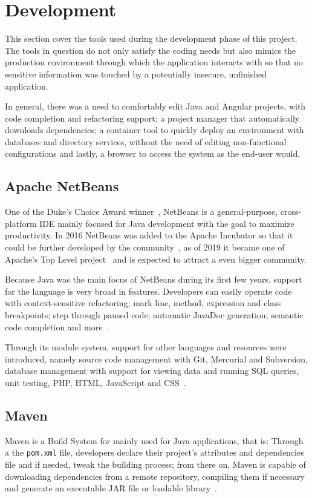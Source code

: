 \section{Development}\label{development}
This section cover the tools used during the development phase of this project. The tools in question do not only satisfy the coding needs but also mimics the production environment through which the application interacts with so that no sensitive information was touched by a potentially insecure, unfinished application.

In general, there was a need to comfortably edit Java and Angular projects, with code completion and refactoring support; a project manager that automatically downloads dependencies; a container tool to quickly deploy an environment with databases and directory services, without the need of editing non-functional configurations and lastly, a browser to access the system as the end-user would.

\subsection{Apache NetBeans}\label{netbeans}
One of the Duke's Choice Award winner~\cite{dukechoice}, NetBeans is a general-purpose, cross-platform \gls{IDE} mainly focused for Java development with the goal to maximize productivity. In 2016 NetBeans was added to the Apache Incubator so that it could be further developed by the community~\cite{incubation}, as of 2019 it became one of Apache's Top Level project~\cite{graduation} and is expected to attract a even bigger community.

Because Java was the main focus of NetBeans during its first few years, support for the language is very broad in features. Developers can easily operate code with context-sensitive refactoring; mark line, method, expression and class breakpoints; step through paused code; automatic JavaDoc generation; semantic code completion and more~\cite{nbassistance}.

Through its module system, support for other languages and resources were introduced, namely source code management with Git, Mercurial and Subversion, database management with support for viewing data and running \gls{SQL} queries, unit testing, PHP, HTML, JavaScript and CSS~\cite{nettutorials}.

\subsection{Maven}
Maven is a Build System for mainly used for Java applications, that is: Through a the \texttt{pom.xml} file, developers declare their project's attributes and dependencies file and if needed, tweak the building process; from there on, Maven is capable of downloading dependencies from a remote repository, compiling them if necessary and generate an executable \gls{JAR} file or loadable library~\cite{maven}.

